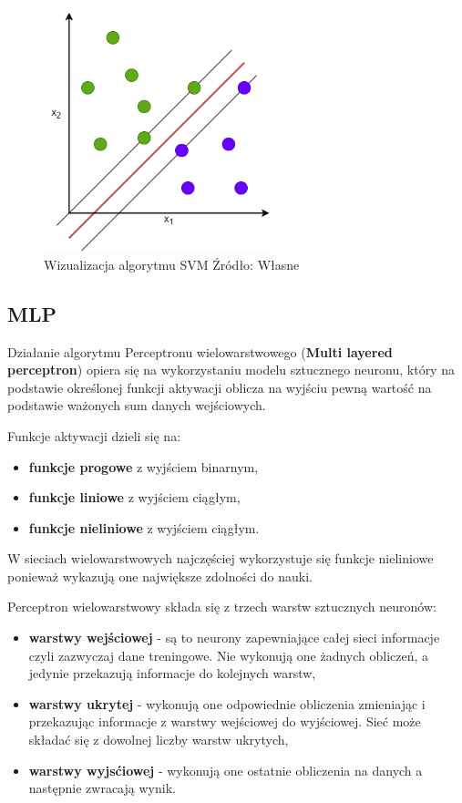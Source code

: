 \begin{figure}[h]
    \centering
    \includegraphics[width=0.6\textwidth]{./Img/SVM.png}
    \caption{Wizualizacja algorytmu SVM Źródło: Własne}
\end{figure}

\subsection{MLP}

Działanie algorytmu Perceptronu wielowarstwowego (\textbf{Multi layered perceptron}) 
opiera się na wykorzystaniu modelu sztucznego neuronu, który na podstawie określonej
funkcji aktywacji oblicza na wyjściu pewną wartość na podstawie ważonych sum danych
wejściowych. 

Funkcje aktywacji dzieli się na:
\begin{itemize}
    \item \textbf{funkcje progowe} z wyjściem binarnym,
    \item \textbf{funkcje liniowe} z wyjściem ciągłym,
    \item \textbf{funkcje nieliniowe} z wyjściem ciągłym.
\end{itemize}
W sieciach wielowarstwowych najczęściej wykorzystuje się funkcje nieliniowe ponieważ 
wykazują one największe zdolności do nauki.

Perceptron wielowarstwowy składa się z trzech warstw sztucznych neuronów: 
\begin{itemize}
    \item \textbf{warstwy wejściowej} - są to neurony zapewniające całej sieci
    informacje czyli zazwyczaj dane treningowe. Nie wykonują one żadnych obliczeń,
    a jedynie przekazują informacje do kolejnych warstw,
    \item \textbf{warstwy ukrytej} - wykonują one odpowiednie obliczenia zmieniając 
    i przekazując informacje z warstwy wejściowej do wyjściowej. Sieć może składać
    się z dowolnej liczby warstw ukrytych,
    \item \textbf{warstwy wyjsćiowej} - wykonują one ostatnie obliczenia na danych 
    a następnie zwracają wynik.
\end{itemize}

